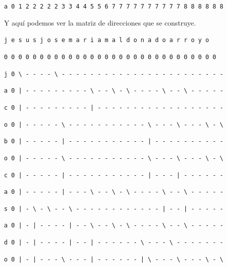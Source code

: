 \documentclass[11pt,a4paper]{article} %
\begin{document}
\texttt{a 0 1 2 2 2 2 2 3 3 4 4 5 5 6 7 7 7 7 7 7 7 7 7 7 8 8 8 8 8 8} \\

\normalsize

Y aquí podemos ver la matriz de direcciones que se construye.\\

\small

\hspace{1,72 em} \texttt{j e s u s j o s e m a r i a m a l d o n a d o a r r o y o}

\hspace{0,71 em} \texttt{0 0 0 0 0 0 0 0 0 0 0 0 0 0 0 0 0 0 0 0 0 0 0 0 0 0 0 0 0 0}

\texttt{j 0 \textbackslash{ }- - - - \textbackslash{ }- - - - - - - - - - - - - - - - - - - - - - -}

\texttt{a 0 | - - - - - - - - - \textbackslash{ }- - \textbackslash{ }- \textbackslash{ }- - - - \textbackslash{ }- - \textbackslash{ }- - - - -}

\texttt{c 0 | - - - - - - - - - | - - - - - - - - - - - - - - - - - -}

\texttt{o 0 | - - - - - \textbackslash{ }- - - - - - - - - - - \textbackslash{ }- - - \textbackslash{ }- - - \textbackslash{ }- \textbackslash}

\texttt{b 0 | - - - - - | - - - - - - - - - - - | - - - - - - - - - -}

\texttt{o 0 | - - - - - \textbackslash{ }- - - - - - - - - - - \textbackslash{ }- - - \textbackslash{ }- - - \textbackslash{ }- \textbackslash}

\texttt{c 0 | - - - - - | - - - - - - - - - - - | - - - | - - - - - -}

\texttt{a 0 | - - - - - | - - - \textbackslash{ }- - \textbackslash{ }- \textbackslash{ }- - - - \textbackslash{ }- - \textbackslash{ }- - - - -}

\texttt{s 0 | - \textbackslash{ }- \textbackslash{ }- - \textbackslash{ }- - - - - - - - - - - - | - - | - - - - -}

\texttt{a 0 | - | - - - - | - - \textbackslash{ }- - \textbackslash{ }- \textbackslash{ }- - - - \textbackslash{ }- - \textbackslash{ }- - - - -}

\texttt{d 0 | - | - - - - | - - | - - - - - - \textbackslash{ }- - - \textbackslash{ }- - - - - - -}

\texttt{o 0 | - | - - - \textbackslash{ }- - - | - - - - - - | \textbackslash{ }- - - \textbackslash{ }- - - \textbackslash{ }- \textbackslash}
\end{document}

